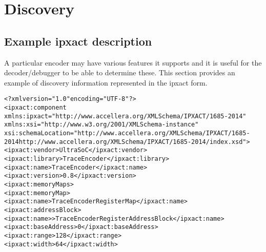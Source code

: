 \chapter{Discovery}

\section{Example ipxact description}

A particular encoder may have various features it supports and it is
useful for the decoder/debugger to be able to determine these. This
section provides an example of discovery information represented in
the ipxact form.

\begin{alltt}
<?xml version="1.0" encoding="UTF-8"?>
<ipxact:component 
   xmlns:ipxact="http://www.accellera.org/XMLSchema/IPXACT/1685-2014"
   xmlns:xsi="http://www.w3.org/2001/XMLSchema-instance" 
   xsi:schemaLocation="http://www.accellera.org/XMLSchema/IPXACT/1685-2014 http://www.accellera.org/XMLSchema/IPXACT/1685-2014/index.xsd">
   <ipxact:vendor>UltraSoC</ipxact:vendor>
   <ipxact:library>TraceEncoder</ipxact:library>
   <ipxact:name>TraceEncoder</ipxact:name>
   <ipxact:version>0.8</ipxact:version>
   <ipxact:memoryMaps>
      <ipxact:memoryMap>
         <ipxact:name>Trace Encoder Register Map</ipxact:name>
         <ipxact:addressBlock>
            <ipxact:name>>Trace Encoder Register Address Block</ipxact:name>
            <ipxact:baseAddress>0</ipxact:baseAddress>
            <ipxact:range>128</ipxact:range>
            <ipxact:width>64</ipxact:width>


\end{alltt}
